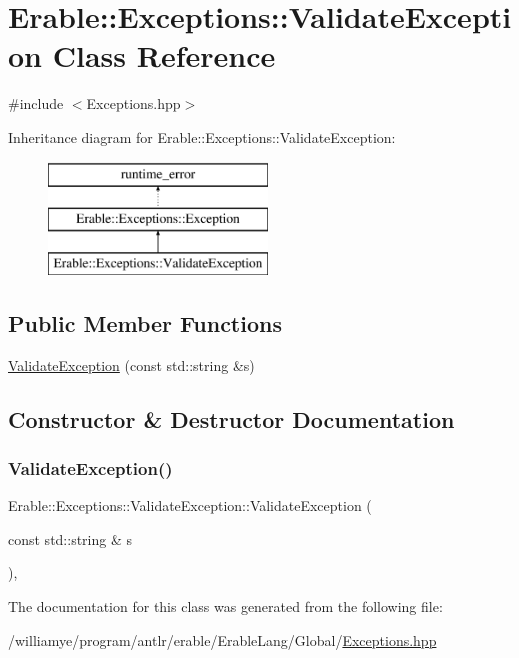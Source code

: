 \hypertarget{class_erable_1_1_exceptions_1_1_validate_exception}{}\section{Erable\+::Exceptions\+::Validate\+Exception Class Reference}
\label{class_erable_1_1_exceptions_1_1_validate_exception}


{\ttfamily \#include $<$Exceptions.\+hpp$>$}

Inheritance diagram for Erable\+::Exceptions\+::Validate\+Exception\+:\begin{figure}[H]
\begin{center}
\leavevmode
\includegraphics[height=3.000000cm]{class_erable_1_1_exceptions_1_1_validate_exception}
\end{center}
\end{figure}
\subsection*{Public Member Functions}
\begin{DoxyCompactItemize}
\item 
\mbox{\hyperlink{class_erable_1_1_exceptions_1_1_validate_exception_adfa8dbb4c0edaa8875e45d66be75456a}{Validate\+Exception}} (const std\+::string \&s)
\end{DoxyCompactItemize}


\subsection{Constructor \& Destructor Documentation}
\mbox{\label{class_erable_1_1_exceptions_1_1_validate_exception_adfa8dbb4c0edaa8875e45d66be75456a}} 
\subsubsection{\texorpdfstring{ValidateException()}{ValidateException()}}
{\footnotesize\ttfamily Erable\+::\+Exceptions\+::\+Validate\+Exception\+::\+Validate\+Exception (\begin{DoxyParamCaption}\item[{const std\+::string \&}]{s }\end{DoxyParamCaption})\hspace{0.3cm}{\ttfamily [inline]}, {\ttfamily [explicit]}}



The documentation for this class was generated from the following file\+:\begin{DoxyCompactItemize}
\item 
/williamye/program/antlr/erable/\+Erable\+Lang/\+Global/\mbox{\hyperlink{_exceptions_8hpp}{Exceptions.\+hpp}}\end{DoxyCompactItemize}
